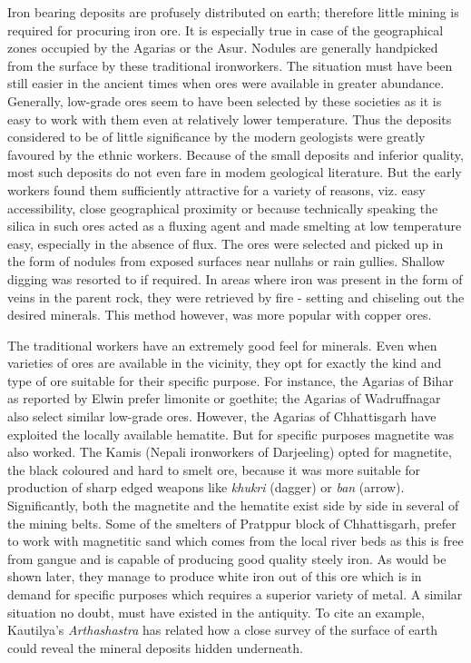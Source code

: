 Iron bearing deposits are profusely distributed on earth; therefore little mining is required for procuring iron ore. It is especially true in case of the geographical zones occupied by the Agarias or the Asur. Nodules are generally handpicked from the surface by these traditional ironworkers. The situation must have been still easier in the ancient times when ores were available in greater abundance. Generally, low-grade ores seem to have been selected by these societies as it is easy to work with them even at relatively lower temperature. Thus the deposits considered to be of little significance by the modern geologists were greatly favoured by the ethnic workers. Because of the small deposits and inferior quality, most such deposits do not even fare in modem geological literature. But the early workers found them sufficiently attractive for a variety of reasons, viz. easy accessibility, close geographical proximity or because technically speaking the silica in such ores acted as a fluxing agent and made smelting at low temperature easy, especially in the absence of flux. The ores were selected and picked up in the form of nodules from exposed surfaces near nullahs or rain gullies. Shallow digging was resorted to if required. In areas where iron was present in the form of veins in the parent rock, they were retrieved by fire - setting and chiseling out the desired minerals. This method however, was more popular with copper ores.

The traditional workers have an extremely good feel for minerals. Even when varieties of ores are available in the vicinity, they opt for exactly the kind and type of ore suitable for their specific purpose. For instance, the Agarias of Bihar as reported by Elwin prefer limonite or goethite; the Agarias of Wadruffnagar also select similar low-grade ores. However, the Agarias of Chhattisgarh have exploited the locally available hematite. But for specific purposes magnetite was also worked. The Kamis (Nepali ironworkers of Darjeeling) opted for magnetite, the black coloured and hard to smelt ore, because it was more suitable for production of sharp edged weapons like {\it khukri} (dagger) or {\it ban} (arrow). Significantly, both the magnetite and the hematite exist side by side in several of the mining belts. Some of the smelters of Pratppur block of Chhattisgarh, prefer to work with magnetitic sand which comes from the local river beds as this is free from gangue and is capable of producing good quality steely iron. As would be shown later, they manage to produce white iron out of this ore which is in demand for specific purposes which requires a superior variety of metal. A similar situation no doubt, must have existed in the antiquity. To cite an example, Kautilya's {\it Arthashastra} has related how a close survey of the surface of earth could reveal the mineral deposits hidden underneath.

